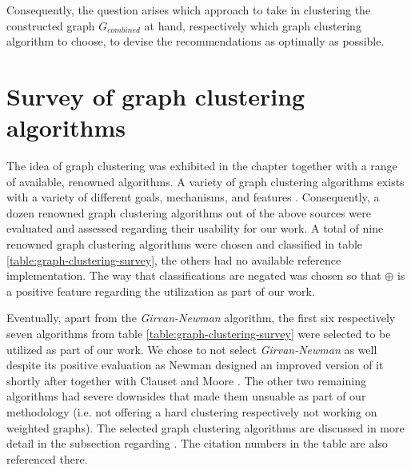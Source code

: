 \documentclass[12pt,a4paper]{report}
\begin{document}
Consequently, the question arises which approach to take in clustering the
constructed graph \(G_{combined}\) at hand, respectively which graph clustering
algorithm to choose, to devise the recommendations as optimally as possible.



\section{Survey of graph clustering algorithms} \label{sect:graph-clustering-algorithm-survey}

The idea of graph clustering was exhibited in the \textit{}
chapter together with a range of available, renowned algorithms.
A variety of graph clustering algorithms exists with a variety of different
goals, mechanisms, and features
\cite{lancichinetti2009community, fortunato2010community, danon2005comparing}.
Consequently, a dozen renowned graph clustering algorithms out of the above sources
were evaluated and assessed regarding their usability for our work.
A total of nine renowned graph clustering algorithms were chosen and classified
in table \ref{table:graph-clustering-survey}, the others had no available
reference implementation.
The way that classifications are negated was chosen so that $\oplus$
is a positive feature regarding the utilization as part of our work.

Eventually, apart from the \textit{Girvan-Newman} algorithm, the first six
respectively seven algorithms from table
\ref{table:graph-clustering-survey} were selected to be utilized as part of our work.
We chose to not select \textit{Girvan-Newman} as well despite its positive evaluation as Newman
designed an improved version of it shortly after together with Clauset and Moore
\cite{clauset2004modularity}.
The other two remaining algorithms had severe downsides that made them unsuable
as part of our methodology (i.e. not offering a hard clustering respectively
not working on weighted graphs).
The selected graph clustering algorithms are discussed in more detail in the
\textit{} subsection regarding
\textit{}.
The citation numbers in the table are also referenced there.
\end{document}
